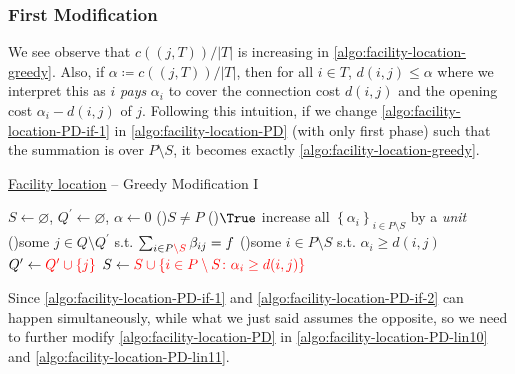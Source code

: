 \subsubsection{First Modification}
We see observe that \(c((j, T)) / \left\vert T \right\vert \) is increasing in \autoref{algo:facility-location-greedy}. Also, if \(\alpha \coloneqq c((j, T)) / \left\vert T \right\vert\), then for all \(i\in T\), \(d(i, j) \leq \alpha \) where we interpret this as \(i\) \emph{pays} \(\alpha _i\) to cover the connection cost \(d(i, j)\) and the opening cost \(\alpha _i - d(i, j)\) of \(j\). Following this intuition, if we change \autoref{algo:facility-location-PD-if-1} in \autoref{algo:facility-location-PD} (with only first phase) such that the summation is over \(P\setminus S\), it becomes exactly \autoref{algo:facility-location-greedy}.

\begin{algorithm}[H]\label{algo:facility-location-greedy-I}
	\DontPrintSemicolon
	\caption{\hyperref[prb:facility-location]{Facility location} -- Greedy Modification I}
	\BlankLine
	\(S\gets \varnothing \), \(Q^\prime \gets \varnothing \), \(\alpha \gets 0\) 
	\;
	\While(){\(S \neq P\)}{
	\While(){\(\True\)}{
	increase all \(\left\{ \alpha _i \right\}_{i\in P\setminus S} \) by a \emph{unit}\;
	\uIf(){some \(j\in Q\setminus Q^\prime \) s.t. \(\sum_{i\in P\mathcolor{red}{\setminus S}} \beta _{ij} = f\)}{
		\Break
	}
	\ElseIf(){some \(i\in P\setminus S\) s.t. \(\alpha_i \geq d(i, j)\)}{
		\Break
	}
	}
	\(Q^\prime \gets \mathcolor{red}{Q^\prime  \cup \left\{ j \right\}}\)
	\(S\gets \mathcolor{red}{S \cup \left\{ i\in P\setminus S\colon \alpha _i \geq d(i, j)\right\} }\)
	}
	\;
\end{algorithm}

\begin{remark}
	Since \autoref{algo:facility-location-PD-if-1} and \autoref{algo:facility-location-PD-if-2} can happen simultaneously, while what we just said assumes the opposite, so we need to further modify \autoref{algo:facility-location-PD} in \autoref{algo:facility-location-PD-lin10} and \autoref{algo:facility-location-PD-lin11}.
\end{remark}

